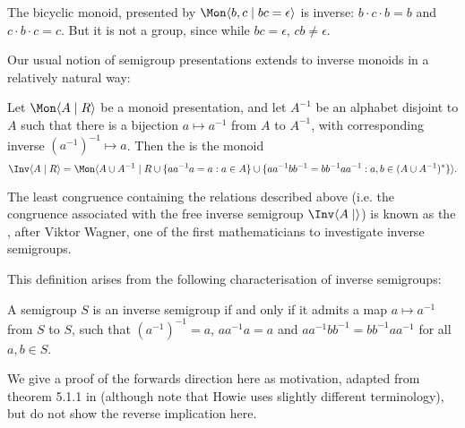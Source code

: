 \documentclass[noindex,noinsetproof,12pt]{lmaths}
\begin{document}
\begin{example}
The bicyclic monoid, presented by $\Mon \langle b, c \mid bc = \epsilon \rangle$  is inverse: $b\cdot c\cdot b = b$ and $c\cdot b \cdot c = c$. But it is not a group, since while $bc = \epsilon$, $cb \ne \epsilon$.
\end{example}

Our usual notion of semigroup presentations extends to inverse monoids in a relatively natural way:

\begin{defn}
	Let $\Mon \langle A \mid R \rangle$ be a monoid presentation, and let $A^{-1}$ be an alphabet disjoint to $A$ such that there is a bijection $a \mapsto a^{-1}$ from $A$ to $A^{-1}$, with corresponding inverse $(a^{-1})^{-1} \mapsto a$. Then the  is the monoid
	\[ \Inv \langle A \mid R \rangle = \Mon \langle A \cup A^{-1} \mid R \cup \{ aa^{-1}a = a : a \in A \} \cup \{ aa^{-1}bb^{-1} = bb^{-1}aa^{-1} : a, b \in (A \cup A^{-1})^* \}\rangle. \]
\end{defn}

The least congruence containing the relations described above (i.e. the congruence associated with the free inverse semigroup $\Inv \langle A \mid\rangle$) is known as the , after Viktor Wagner, one of the first mathematicians to investigate inverse semigroups.

This definition arises from the following characterisation of inverse semigroups:
\begin{theorem} \label{thm:inv-semigp-cond}
	A semigroup $S$ is an inverse semigroup if and only if it admits a map $a \mapsto a^{-1}$ from $S$ to $S$, such that $(a^{-1})^{-1} = a$, $aa^{-1}a = a$ and $aa^{-1}bb^{-1} = bb^{-1}aa^{-1}$ for all $a, b \in S$.
\end{theorem}

We give a proof of the forwards direction here as motivation, adapted from theorem 5.1.1 in \cite{Howie1995} (although note that Howie uses slightly different terminology), but do not show the reverse implication here.
\end{document}
